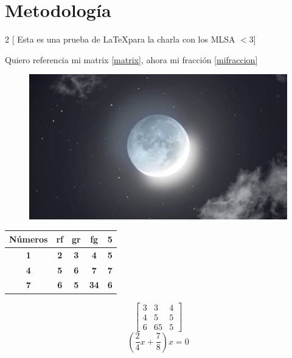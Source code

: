 \section{Metodología}
\begin{multicols}{2}
    [ Esta es una prueba de \LaTeX para la charla con los MLSA $<3$]
    \blindtext
\end{multicols}
\lipsum[1]

Quiero referencia mi matrix \ref{matrix}, ahora mi fracción \ref{mifraccion}
\begin{figure}
    \includegraphics[width=\linewidth]{build/img/luna.jpg}
\end{figure}

\begin{table}[]
    \begin{tabular}{|c|c|c|c|c|}
    \hline
    \textbf{Números} & \textbf{rf} & \textbf{gr} & \textbf{fg} & \textbf{5}  \\ \hline
    \textbf{1}       & \textbf{2}  & \textbf{3}  & \textbf{4}  & \textbf{5} \\ \hline
    \textbf{4}       & \textbf{5}  & \textbf{6}  & \textbf{7}  & \textbf{7} \\ \hline
    \textbf{7}       & \textbf{6}  & \textbf{5}  & \textbf{34} & \textbf{6} \\ \hline
    \end{tabular}
    \end{table}

\begin{equation} \label{matrix}
    \begin{bmatrix}
        3&3  & 4\\ 
        4& 5 & 5\\ 
        6& 65 & 5
    \end{bmatrix}    
\end{equation}
\begin{equation} \label{mifraccion}
   \left( \frac{2}{4}x + \frac{7}{8}\right)x=0   
\end{equation}

